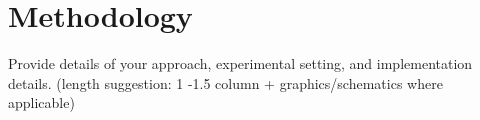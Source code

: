 \section{Methodology}
\label{sec:methodology}

Provide details of your approach, experimental setting, and implementation details. (length suggestion: 1 -1.5 column + graphics/schematics where applicable)



